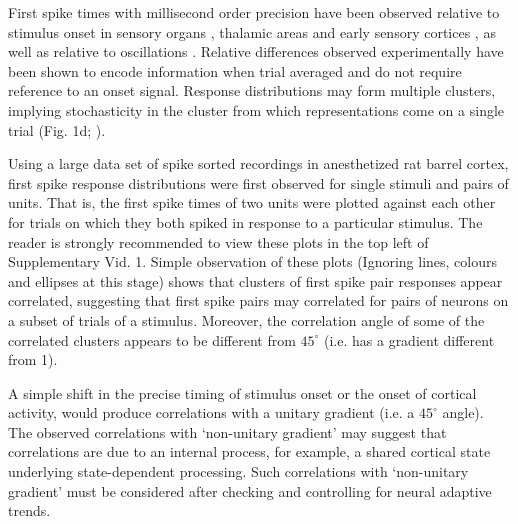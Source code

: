 \documentclass{article}
\begin{document}
First spike times with millisecond order precision have been observed relative to stimulus onset in sensory organs \cite{johansson2004first, uzzell2004precision, gollisch2008rapid}, thalamic areas \cite{reinagel2002precise, storchi2012comparison} and early sensory cortices \cite{reyes2014laminar}, as well as relative to oscillations \cite{havenith2011synchrony}. Relative differences \cite{izhikevich2006polychronization} observed experimentally \cite{johansson2004first, gollisch2008rapid, reyes2014laminar} have been shown to encode information when trial averaged \cite{gollisch2008rapid} and do not require reference to an onset signal.
Response distributions may form multiple clusters, implying stochasticity in the cluster from which representations come on a single trial (Fig. 1d; \cite{reyes2014laminar}).

Using a large data set of spike sorted recordings in anesthetized rat barrel cortex, first spike response distributions were first observed for single stimuli and pairs of units. That is, the first spike times of two units were plotted against each other for trials on which they both spiked in response to a particular stimulus. The reader is strongly recommended to view these plots in the top left of Supplementary Vid. 1. Simple observation of these plots (Ignoring lines, colours and ellipses at this stage) shows that clusters of first spike pair responses appear correlated, suggesting that first spike pairs may correlated for pairs of neurons on a subset of trials of a stimulus. Moreover, the correlation angle of some of the correlated clusters appears to be different from $45^{\circ}$ (i.e. has a gradient different from 1).



A simple shift in the precise timing of stimulus onset or the onset of cortical activity, would produce correlations with a unitary gradient (i.e. a $45^{\circ}$ angle). The observed correlations with `non-unitary gradient' may suggest that correlations are due to an internal process, for example, a shared cortical state underlying state-dependent processing. Such correlations with `non-unitary gradient' must be considered after checking and controlling for neural adaptive trends.
\end{document}
